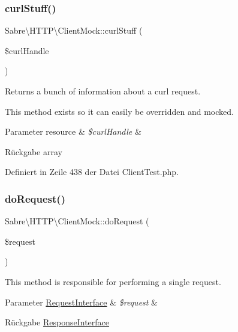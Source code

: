 \subsubsection{\texorpdfstring{curl\+Stuff()}{curlStuff()}}
{\footnotesize\ttfamily Sabre\textbackslash{}\+H\+T\+T\+P\textbackslash{}\+Client\+Mock\+::curl\+Stuff (\begin{DoxyParamCaption}\item[{}]{\$curl\+Handle }\end{DoxyParamCaption})\hspace{0.3cm}{\ttfamily [protected]}}

Returns a bunch of information about a curl request.

This method exists so it can easily be overridden and mocked.


\begin{DoxyParams}[1]{Parameter}
resource & {\em \$curl\+Handle} & \\
\hline
\end{DoxyParams}
\begin{DoxyReturn}{Rückgabe}
array 
\end{DoxyReturn}


Definiert in Zeile 438 der Datei Client\+Test.\+php.

\mbox{\label{class_sabre_1_1_h_t_t_p_1_1_client_mock_afd41b0c0bf662a9d56c46add525a66e5}} 
\subsubsection{\texorpdfstring{do\+Request()}{doRequest()}}
{\footnotesize\ttfamily Sabre\textbackslash{}\+H\+T\+T\+P\textbackslash{}\+Client\+Mock\+::do\+Request (\begin{DoxyParamCaption}\item[{\mbox{\hyperlink{interface_sabre_1_1_h_t_t_p_1_1_request_interface}{Request\+Interface}}}]{\$request }\end{DoxyParamCaption})}

This method is responsible for performing a single request.


\begin{DoxyParams}[1]{Parameter}
\mbox{\hyperlink{interface_sabre_1_1_h_t_t_p_1_1_request_interface}{Request\+Interface}} & {\em \$request} & \\
\hline
\end{DoxyParams}
\begin{DoxyReturn}{Rückgabe}
\mbox{\hyperlink{interface_sabre_1_1_h_t_t_p_1_1_response_interface}{Response\+Interface}} 
\end{DoxyReturn}


